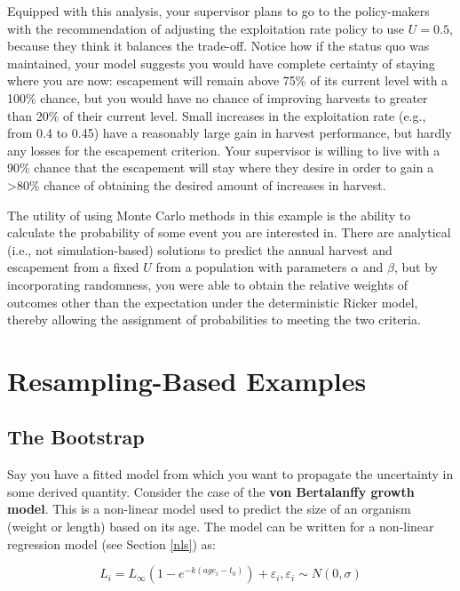 \documentclass[]{book}
\begin{document}
Equipped with this analysis, your supervisor plans to go to the policy-makers with the recommendation of adjusting the exploitation rate policy to use \(U = 0.5\), because they think it balances the trade-off. Notice how if the status quo was maintained, your model suggests you would have complete certainty of staying where you are now: escapement will remain above 75\% of its current level with a 100\% chance, but you would have no chance of improving harvests to greater than 20\% of their current level. Small increases in the exploitation rate (e.g., from 0.4 to 0.45) have a reasonably large gain in harvest performance, but hardly any losses for the escapement criterion. Your supervisor is willing to live with a 90\% chance that the escapement will stay where they desire in order to gain a \textgreater{}80\% chance of obtaining the desired amount of increases in harvest.

The utility of using Monte Carlo methods in this example is the ability to calculate the probability of some event you are interested in. There are analytical (i.e., not simulation-based) solutions to predict the annual harvest and escapement from a fixed \(U\) from a population with parameters \(\alpha\) and \(\beta\), but by incorporating randomness, you were able to obtain the relative weights of outcomes other than the expectation under the deterministic Ricker model, thereby allowing the assignment of probabilities to meeting the two criteria.

\hypertarget{resample-examples}{%
\section{Resampling-Based Examples}\label{resample-examples}}

\hypertarget{boot-test-ex}{%
\subsection{The Bootstrap}\label{boot-test-ex}}

Say you have a fitted model from which you want to propagate the uncertainty in some derived quantity. Consider the case of the \textbf{von Bertalanffy growth model}. This is a non-linear model used to predict the size of an organism (weight or length) based on its age. The model can be written for a non-linear regression model (see Section \ref{nls}) as:

\begin{equation}
  L_i = L_{\infty}\left(1 - e^{-k(age_i-t_0)}\right) + \varepsilon_i, \varepsilon_i \sim N(0, \sigma)
\label{eq:vonB}
\end{equation}
\end{document}
